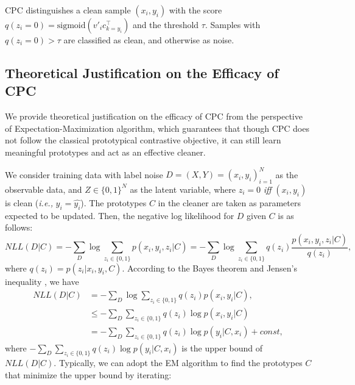 \documentclass{article} \usepackage{iclr2023_conference,times}
\begin{document}
 CPC distinguishes a clean sample $(x_i,y_i)$ with the score $q(z_i=0)=\mathrm{sigmoid}(v'_i c_{k=y_i}^\top)$ and the threshold $\tau$. Samples with $q(z_i=0) > \tau$ are classified as clean, and otherwise as noise.



\subsection{Theoretical Justification on the Efficacy of CPC} \label{sec:em}
We provide theoretical justification on the efficacy of CPC from the perspective of Expectation-Maximization algorithm, which guarantees that though CPC does not follow the classical prototypical contrastive objective, it can  still learn meaningful prototypes and act as an effective cleaner. 

We consider training data with label noise $D=(X, Y)={(x_i, y_i)}_{i=1}^{N}$ as the observable data, and $Z \in  \{0,1\}^N$ as the latent variable, where $z_{i}=0$ \emph{iff} $(x_i, y_i)$ is clean (\emph{i.e.,} $y_i = \hat{y_i}$). The prototypes $C$ in the cleaner are taken as parameters expected to be updated. Then, the negative log likelihood for $D$ given $C$ is as follows:
\begin{equation}
NLL(D|C)  = - \sum_{ D} \log \sum_{z_i \in \{0,1\}} p(x_i,y_i,z_i|C) = - \sum_{D} \log \sum_{z_i \in \{0,1\}} q(z_i) \frac{p(x_i,y_i,z_i|C)}{q(z_i)},
\end{equation}
where $q(z_i) = p(z_i|x_i,y_i,C)$. According to the Bayes theorem and Jensen's inequality , we have
\begin{equation}
\begin{aligned}
NLL(D|C) & =  - \sum_{ D} \log \sum_{z_i \in \{0,1\}} q(z_i) p(x_i,y_i|C),\\
& \leq - \sum_{ D} \sum_{z_i \in \{0,1\}} q(z_i) \log   p(x_i,y_i|C)\\
& = - \sum_{ D} \sum_{z_i \in \{0,1\}} q(z_i) \log   p(y_i|C,x_i) + const,
\end{aligned}
\end{equation}
where $- \sum_{ D} \sum_{z_i \in \{0,1\}} q(z_i) \log   p(y_i|C,x_i)$ is the upper bound of $NLL(D|C)$. Typically, we can adopt the EM algorithm to find the prototypes $C$ that minimize the upper bound by iterating:
\end{document}
